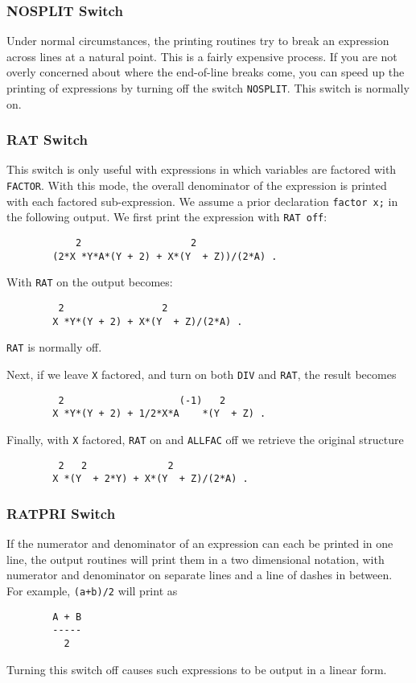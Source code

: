 \subsubsection{NOSPLIT Switch}

Under normal circumstances, the printing routines try to break an expression
across lines at a natural point.  This is a fairly expensive process.  If
you are not overly concerned about where the end-of-line breaks come, you
can speed up the printing of expressions by turning off the switch
{\tt NOSPLIT}.  This switch is normally on.

\subsubsection{RAT Switch}

This switch is only useful with expressions in which variables are
factored with {\tt FACTOR}. With this mode, the overall denominator of the
expression is printed with each factored sub-expression. We assume a prior
declaration {\tt factor x;} in the following output. We first print the
expression with {\tt RAT off}:
\begin{verbatim}
            2                   2
        (2*X *Y*A*(Y + 2) + X*(Y  + Z))/(2*A) .
\end{verbatim}
With {\tt RAT} on the output becomes:
\begin{verbatim}
         2                 2
        X *Y*(Y + 2) + X*(Y  + Z)/(2*A) .
\end{verbatim}
{\tt RAT} is normally off.

Next, if we leave {\tt X} factored, and turn on both {\tt DIV} and
{\tt RAT}, the result becomes
\begin{verbatim}
         2                    (-1)   2
        X *Y*(Y + 2) + 1/2*X*A    *(Y  + Z) .
\end{verbatim}
Finally, with {\tt X} factored, {\tt RAT} on and {\tt ALLFAC}
off we retrieve the original structure
\begin{verbatim}
         2   2              2
        X *(Y  + 2*Y) + X*(Y  + Z)/(2*A) .
\end{verbatim}

\subsubsection{RATPRI Switch}

If the numerator and denominator of an expression can each be printed in
one line, the output routines will print them in a two dimensional
notation, with numerator and denominator on separate lines and a line of
dashes in between. For example, {\tt (a+b)/2} will print as
\begin{verbatim}
        A + B
        -----
          2
\end{verbatim}
Turning this switch off causes such expressions to be output in a linear
form.

